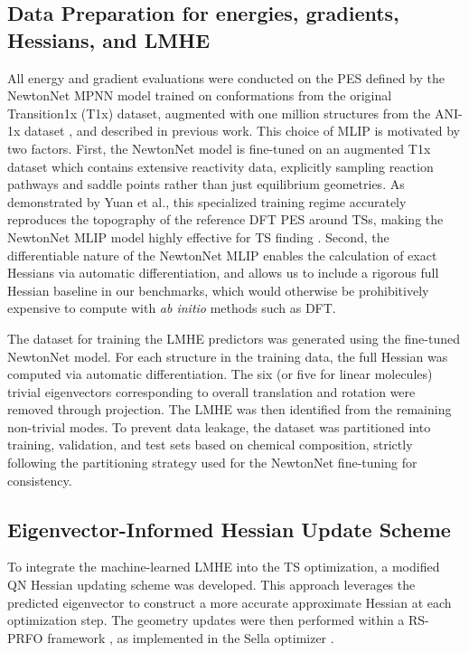 \documentclass[12pt]{article}
\begin{document}
\subsection{Data Preparation for energies, gradients, Hessians, and LMHE} \label{data_preparation}
All energy and gradient evaluations were conducted on the PES defined by the NewtonNet MPNN model\cite{NewtonNet} trained on conformations from the original Transition1x (T1x) dataset\cite{T1x}, augmented with one million structures from the ANI-1x dataset \cite{ANI1x}, and described in previous work\cite{Yuan2024}. This choice of MLIP is motivated by two factors. First, the NewtonNet model is fine-tuned on an augmented T1x dataset which contains extensive reactivity data, explicitly sampling reaction pathways and saddle points rather than just equilibrium geometries. As demonstrated by Yuan et al., this specialized training regime accurately reproduces the topography of the reference DFT PES around TSs, making the NewtonNet MLIP model highly effective for TS finding \cite{Yuan2024}. Second, the differentiable nature of the NewtonNet MLIP enables the calculation of exact Hessians via automatic differentiation, and allows us to include a rigorous full Hessian baseline in our benchmarks, which would otherwise be prohibitively expensive to compute with \textit{ab initio} methods such as DFT.\par

The dataset for training the LMHE predictors was generated using the fine-tuned NewtonNet model\cite{NewtonNet, Yuan2024}. For each structure in the training data, the full Hessian was computed via automatic differentiation\cite{Yuan2024}. The six (or five for linear molecules) trivial eigenvectors corresponding to overall translation and rotation were removed through projection. The LMHE was then identified from the remaining non-trivial modes. To prevent data leakage, the dataset was partitioned into training, validation, and test sets based on chemical composition, strictly following the partitioning strategy used for the NewtonNet fine-tuning\cite{Yuan2024} for consistency. \par


\subsection{Eigenvector-Informed Hessian Update Scheme} \label{hessian_update}

To integrate the machine-learned LMHE into the TS optimization, a modified QN Hessian updating scheme was developed. This approach leverages the predicted eigenvector to construct a more accurate approximate Hessian at each optimization step. The geometry updates were then performed within a RS-PRFO framework \cite{prfo1, prfo2, prfo3}, as implemented in the Sella optimizer \cite{Sella2}.\par
\end{document}
